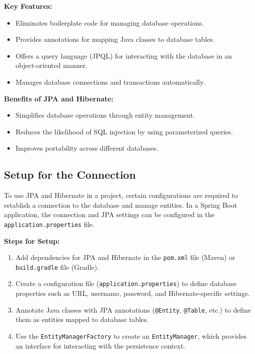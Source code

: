 \documentclass{article}
\begin{document}
\textbf{Key Features:}
\begin{itemize}
    \item Eliminates boilerplate code for managing database operations.
    \item Provides annotations for mapping Java classes to database tables.
    \item Offers a query language (JPQL) for interacting with the database in an object-oriented manner.
    \item Manages database connections and transactions automatically.
\end{itemize}

\textbf{Benefits of JPA and Hibernate:}
\begin{itemize}
    \item Simplifies database operations through entity management.
    \item Reduces the likelihood of SQL injection by using parameterized queries.
    \item Improves portability across different databases.
\end{itemize}
\subsection{Setup for the Connection}

To use JPA and Hibernate in a project, certain configurations are required to establish a connection to the database and manage entities. In a Spring Boot application, the connection and JPA settings can be configured in the \texttt{application.properties} file.

\textbf{Steps for Setup:}
\begin{enumerate}
    \item Add dependencies for JPA and Hibernate in the \texttt{pom.xml} file (Maven) or \texttt{build.gradle} file (Gradle).
    \item Create a configuration file (\texttt{application.properties}) to define database properties such as URL, username, password, and Hibernate-specific settings.
    \item Annotate Java classes with JPA annotations (\texttt{@Entity}, \texttt{@Table}, etc.) to define them as entities mapped to database tables.
    \item Use the \texttt{EntityManagerFactory} to create an \texttt{EntityManager}, which provides an interface for interacting with the persistence context.
\end{enumerate}
\end{document}
